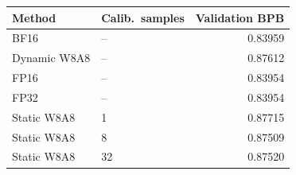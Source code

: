 \begin{tabular}{llr}
\toprule
Method & Calib.\ samples & Validation BPB \\
\midrule
BF16 & -- & 0.83959 \\
Dynamic W8A8 & -- & 0.87612 \\
FP16 & -- & 0.83954 \\
FP32 & -- & 0.83954 \\
Static W8A8 & 1 & 0.87715 \\
Static W8A8 & 8 & 0.87509 \\
Static W8A8 & 32 & 0.87520 \\
\bottomrule
\end{tabular}

